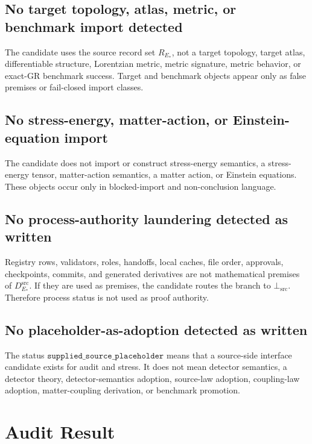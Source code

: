 \documentclass[11pt]{article}
\newcommand{\RStar}{R_{E_{\ast}}}
\newcommand{\DSrc}{D^{\mathrm{src}}_{E_{\ast}}}
\newcommand{\BottomSrc}{\bot_{\mathrm{src}}}
\begin{document}
\subsection{No target topology, atlas, metric, or benchmark import detected}

The candidate uses the source record set \(\RStar\), not a target topology,
target atlas, differentiable structure, Lorentzian metric, metric signature,
metric behavior, or exact-GR benchmark success. Target and benchmark objects
appear only as false premises or fail-closed import classes.

\subsection{No stress-energy, matter-action, or Einstein-equation import}

The candidate does not import or construct stress-energy semantics, a
stress-energy tensor, matter-action semantics, a matter action, or Einstein
equations. These objects occur only in blocked-import and non-conclusion
language.

\subsection{No process-authority laundering detected as written}

Registry rows, validators, roles, handoffs, local caches, file order,
approvals, checkpoints, commits, and generated derivatives are not
mathematical premises of \(\DSrc\). If they are used as premises, the candidate
routes the branch to \(\BottomSrc\). Therefore process status is not used as
proof authority.

\subsection{No placeholder-as-adoption detected as written}

The status \(\texttt{supplied\_source\_placeholder}\) means that a source-side
interface candidate exists for audit and stress. It does not mean detector
semantics, a detector theory, detector-semantics adoption, source-law
adoption, coupling-law adoption, matter-coupling derivation, or benchmark
promotion.

\section{Audit Result}
\end{document}
